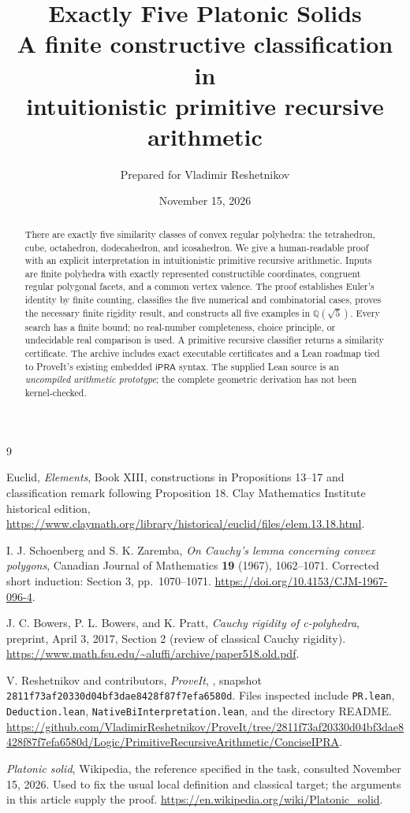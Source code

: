 \documentclass[11pt]{article}
\title{\textbf{Exactly Five Platonic Solids}\\[6pt]
\large A finite constructive classification in\\intuitionistic primitive recursive arithmetic}
\author{Prepared for Vladimir Reshetnikov}
\date{November 15, 2026}
\theoremstyle{definition}
\newcommand{\ipra}{\mathsf{iPRA}}
\newcommand{\Q}{\mathbb Q}
\newcommand{\code}[1]{\texttt{#1}}
\begin{document}
\maketitle
\begin{abstract}
There are exactly five similarity classes of convex regular polyhedra:
the tetrahedron, cube, octahedron, dodecahedron, and icosahedron.
We give a human-readable proof with an explicit interpretation in
intuitionistic primitive recursive arithmetic. Inputs are finite polyhedra
with exactly represented constructible coordinates, congruent regular
polygonal facets, and a common vertex valence. The proof establishes
Euler's identity by finite counting, classifies the five numerical and
combinatorial cases, proves the necessary finite rigidity result, and
constructs all five examples in $\Q(\sqrt5)$. Every search has a finite
bound; no real-number completeness, choice principle, or undecidable
real comparison is used. A primitive recursive classifier returns a
similarity certificate. The archive includes exact executable certificates
and a Lean roadmap tied to ProveIt's existing embedded $\ipra$ syntax.
The supplied Lean source is an \emph{uncompiled arithmetic prototype};
the complete geometric derivation has not been kernel-checked.
\end{abstract}
\newpage
\tableofcontents
\newpage





\clearpage
\begin{thebibliography}{9}
\raggedright
{}
Euclid, \emph{Elements}, Book XIII, constructions in Propositions 13--17
and classification remark following Proposition 18.
Clay Mathematics Institute historical edition,
\url{https://www.claymath.org/library/historical/euclid/files/elem.13.18.html}.

I. J. Schoenberg and S. K. Zaremba,
\emph{On Cauchy's lemma concerning convex polygons},
Canadian Journal of Mathematics \textbf{19} (1967), 1062--1071.
Corrected short induction: Section 3, pp.\ 1070--1071.
\url{https://doi.org/10.4153/CJM-1967-096-4}.

J. C. Bowers, P. L. Bowers, and K. Pratt,
\emph{Cauchy rigidity of c-polyhedra}, preprint, April 3, 2017,
Section 2 (review of classical Cauchy rigidity).
\url{https://www.math.fsu.edu/~aluffi/archive/paper518.old.pdf}.

V. Reshetnikov and contributors, \emph{ProveIt},
,
snapshot \code{2811f73af20330d04bf3dae8428f87f7efa6580d}.
Files inspected include \code{PR.lean}, \code{Deduction.lean},
\code{NativeBiInterpretation.lean}, and the directory README.
\url{https://github.com/VladimirReshetnikov/ProveIt/tree/2811f73af20330d04bf3dae8428f87f7efa6580d/Logic/PrimitiveRecursiveArithmetic/ConciseIPRA}.

\emph{Platonic solid}, Wikipedia, the reference specified in the task,
consulted November 15, 2026. Used to fix the usual local definition and
classical target; the arguments in this article supply the proof.
\url{https://en.wikipedia.org/wiki/Platonic_solid}.
\end{thebibliography}
\end{document}
